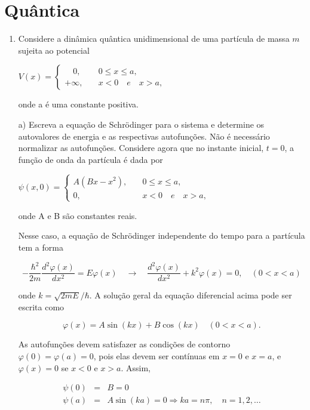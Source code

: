 %
%
\chapter{Quântica}

\begin{enumerate}[start=1,label={\bfseries Q\arabic*.}]



\item Considere a dinâmica quântica unidimensional de uma partícula de massa $m$ sujeita ao potencial
\begin{center}
$V(x) = \left\{\begin{array}{cc} \quad 0,& \quad 0 \leq x \leq a, \\ +\infty,& \quad x < 0 \quad e \quad x > a, \end{array}\right.$
\end{center}
onde a é uma constante positiva.


a) Escreva a equação de Schrödinger para o sistema e determine os autovalores de energia e as respectivas autofunções. Não é necessário normalizar as autofunções. Considere agora que no instante inicial, $t = 0$, a função de onda da partícula é dada por
\begin{center}
$\psi(x,0) = \left\{\begin{array}{cc} A(Bx - x^{2}),& \quad 0 \leq x \leq a, \\ 0,& \quad x < 0 \quad e \quad x > a, \end{array}\right.$
\end{center}
onde A e B são constantes reais.


{\color{red}

Nesse caso, a equação de Schrödinger independente do tempo para a partícula tem a forma

  $$
  -\frac{\hbar^{2}}{2 m} \frac{d^{2} \varphi(x)}{d x^{2}}=E \varphi(x) \quad \rightarrow \quad \frac{d^{2} \varphi(x)}{d x^{2}}+k^{2} \varphi(x)=0, \quad(0<x<a)
  $$

  onde $k = \sqrt{2mE}/\hbar$. A solução geral da equação diferencial acima pode ser escrita como


  $$
  \varphi(x)=A \sin (k x)+B \cos (k x) \quad (0<x<a).
  $$

  As autofunções devem satisfazer as condições de contorno $\varphi(0)=\varphi(a)=0$, pois elas devem ser contínuas em $x=0$ e $x=a$, e $\varphi(x) = 0$ se $x < 0$ e $x > a$. Assim,


\begin{eqnarray*}
\psi(0)&=& B = 0\\
\psi(a)&=& A \sin (k a) = 0 \Rightarrow k a = n \pi, \quad n = 1,2, \ldots
\end{eqnarray*}



}
\end{enumerate}
